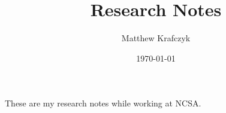 \documentclass{article}
\title{Research Notes}
\author{Matthew Krafczyk}
\date{\today}
\begin{document}
\maketitle

These are my research notes while working at NCSA.



\end{document}
